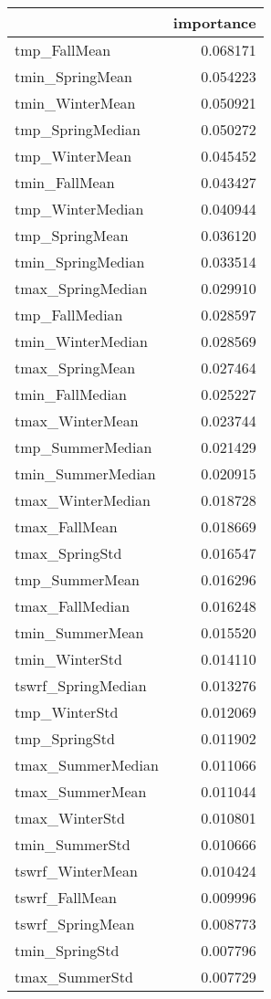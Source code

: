 \begin{tabular}{lr}
\toprule
 & importance \\
\midrule
tmp_FallMean & 0.068171 \\
tmin_SpringMean & 0.054223 \\
tmin_WinterMean & 0.050921 \\
tmp_SpringMedian & 0.050272 \\
tmp_WinterMean & 0.045452 \\
tmin_FallMean & 0.043427 \\
tmp_WinterMedian & 0.040944 \\
tmp_SpringMean & 0.036120 \\
tmin_SpringMedian & 0.033514 \\
tmax_SpringMedian & 0.029910 \\
tmp_FallMedian & 0.028597 \\
tmin_WinterMedian & 0.028569 \\
tmax_SpringMean & 0.027464 \\
tmin_FallMedian & 0.025227 \\
tmax_WinterMean & 0.023744 \\
tmp_SummerMedian & 0.021429 \\
tmin_SummerMedian & 0.020915 \\
tmax_WinterMedian & 0.018728 \\
tmax_FallMean & 0.018669 \\
tmax_SpringStd & 0.016547 \\
tmp_SummerMean & 0.016296 \\
tmax_FallMedian & 0.016248 \\
tmin_SummerMean & 0.015520 \\
tmin_WinterStd & 0.014110 \\
tswrf_SpringMedian & 0.013276 \\
tmp_WinterStd & 0.012069 \\
tmp_SpringStd & 0.011902 \\
tmax_SummerMedian & 0.011066 \\
tmax_SummerMean & 0.011044 \\
tmax_WinterStd & 0.010801 \\
tmin_SummerStd & 0.010666 \\
tswrf_WinterMean & 0.010424 \\
tswrf_FallMean & 0.009996 \\
tswrf_SpringMean & 0.008773 \\
tmin_SpringStd & 0.007796 \\
tmax_SummerStd & 0.007729 \\

\end{tabular}
